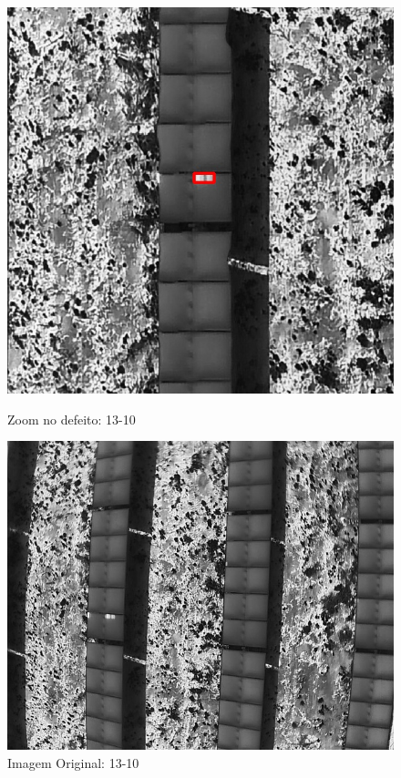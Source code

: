 \documentclass[dvipsnames]{article}%
\begin{document}
\begin{figure}[h!]
\begin{minipage}{0.31\linewidth}
\centering%
\centering%
\includegraphics[width=\linewidth]{report_images/hotspots_13-10_cropped.jpg}%
\caption{Zoom no defeito: 13-10}%
\end{minipage}%
\hfill%
\begin{minipage}{0.31\linewidth}%
\centering%
\centering%
\includegraphics[width=\linewidth]{report_images/hotspots_13-10.jpg}%
\caption{Imagem Original: 13-10}%
\end{minipage}%
\end{figure}
\end{document}

